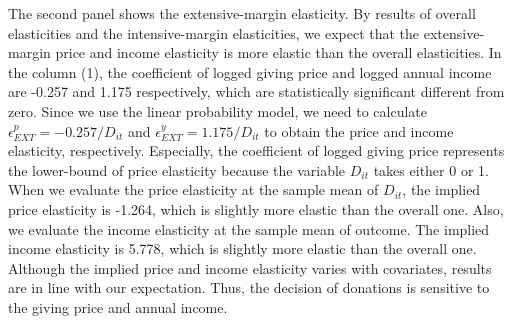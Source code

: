 \documentclass[ review  , 3p ]{elsarticle}
\begin{document}
  The second panel shows the extensive-margin elasticity.
  By results of overall elasticities and the intensive-margin elasticities,
  we expect that the extensive-margin price and income elasticity is more elastic than the overall elasticities.
  In the column (1), the coefficient of logged giving price and logged annual income are -0.257 and 1.175 respectively,
  which are statistically significant different from zero.
  Since we use the linear probability model,
  we need to calculate \(\epsilon^p_{EXT} = -0.257/D_{it}\) and \(\epsilon^y_{EXT} = 1.175/D_{it}\)
  to obtain the price and income elasticity, respectively.
  Especially, the coefficient of logged giving price represents the lower-bound of price elasticity
  because the variable \(D_{it}\) takes either 0 or 1.
  When we evaluate the price elasticity at the sample mean of \(D_{it}\),
  the implied price elasticity is -1.264, which is slightly more elastic than the overall one.
  Also, we evaluate the income elasticity at the sample mean of outcome.
  The implied income elasticity is 5.778, which is slightly more elastic than the overall one.
  Although the implied price and income elasticity varies with covariates,
  results are in line with our expectation.
  Thus, the decision of donations is sensitive to the giving price and annual income.
\end{document}
